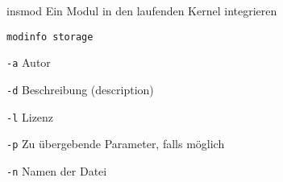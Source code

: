 \begin{flashcard}[Command]{insmod}
	Ein Modul in den laufenden Kernel integrieren
	\begin{description}
		\item  [Example] \texttt{modinfo storage}
		\item [Options]
			\item \texttt{-a} Autor 
			\item \texttt{-d} Beschreibung (description) 
			\item \texttt{-l} Lizenz
			\item \texttt{-p} Zu übergebende Parameter, falls möglich
			\item \texttt{-n} Namen der Datei
	\end{description}
\end{flashcard}